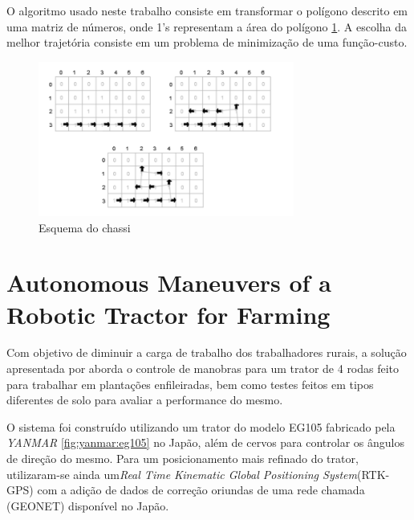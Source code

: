 O algoritmo usado neste trabalho consiste em transformar o polígono descrito em uma matriz de números, onde 1's representam a área do polígono \ref{fig:matriz:poligono}. A escolha da melhor trajetória consiste em um problema de minimização de uma função-custo.
\begin{figure}[H]
    \centering
    \includegraphics[width=0.75\textwidth]{figuras/matrizesPoligno.png}
    \caption{Esquema do chassi}
    \label{fig:matriz:poligono}
\end{figure}
\section{Autonomous Maneuvers of a Robotic Tractor for
Farming}

Com objetivo de diminuir a carga de trabalho dos trabalhadores rurais, a solução apresentada por \cite{Wang2016} aborda o controle de manobras para um trator de 4 rodas feito para trabalhar em plantações enfileiradas, bem como testes feitos em tipos diferentes de solo para avaliar a performance do mesmo.

O sistema foi construído utilizando um trator do modelo EG105 fabricado pela \textit{YANMAR} \ref{fig:yanmar:eg105} no Japão, além de cervos para controlar os ângulos de direção do mesmo. Para um posicionamento mais refinado do trator, utilizaram-se ainda um\textit{Real Time Kinematic Global Positioning System}(RTK-GPS) com a adição de dados de correção oriundas de uma rede chamada (GEONET)  disponível no Japão. 

